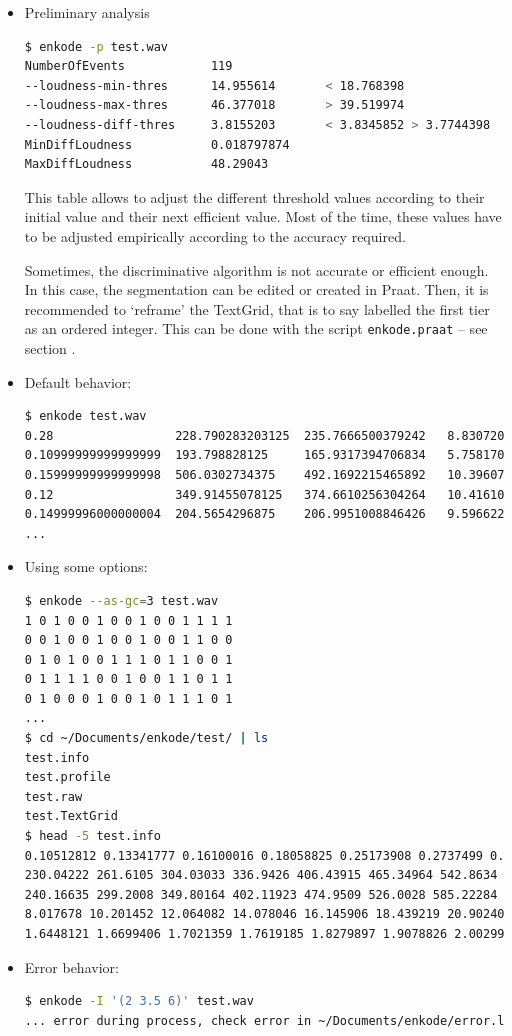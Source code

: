 \begin{itemize}
\item Preliminary analysis
\begin{lstlisting}[language=bash]
$ enkode -p test.wav 
NumberOfEvents            119
--loudness-min-thres      14.955614       < 18.768398
--loudness-max-thres      46.377018       > 39.519974
--loudness-diff-thres     3.8155203       < 3.8345852 > 3.7744398
MinDiffLoudness           0.018797874
MaxDiffLoudness           48.29043
\end{lstlisting}
This table allows to adjust the different threshold values according to their initial value and their next efficient value.
Most of the time, these values have to be adjusted empirically according to the accuracy required.

\smallskip

Sometimes, the discriminative algorithm is not accurate or efficient enough. In this case, the segmentation can be edited or created in Praat. 
Then, it is recommended to `reframe' the TextGrid, that is to say labelled the first tier as an ordered integer. This can be done with the script \texttt{enkode.praat} -- see section .

\item Default behavior:
\begin{lstlisting}[language=bash]
$ enkode test.wav 
0.28                 228.790283203125  235.7666500379242   8.830720512009613    1.7966619273740976  
0.10999999999999999  193.798828125     165.9317394706834   5.758170441172713    1.9914783596510206  
0.15999999999999998  506.0302734375    492.1692215465892   10.396071452511483   1.6476902981421457  
0.12                 349.91455078125   374.6610256304264   10.416102008324566   1.6657044245205024  
0.14999996000000004  204.5654296875    206.9951008846426   9.59662211074838     1.9097877289745604     
...
\end{lstlisting}
\item Using some options:
\begin{lstlisting}[language=bash]
$ enkode --as-gc=3 test.wav
1 0 1 0 0 1 0 0 1 0 0 1 1 1 1  
0 0 1 0 0 1 0 0 1 0 0 1 1 0 0  
0 1 0 1 0 0 1 1 1 0 1 1 0 0 1  
0 1 1 1 1 0 0 1 0 0 1 1 0 1 1  
0 1 0 0 0 1 0 0 1 0 1 1 1 0 1   
...  
$ cd ~/Documents/enkode/test/ | ls
test.info
test.profile
test.raw	
test.TextGrid
$ head -5 test.info
0.10512812 0.13341777 0.16100016 0.18058825 0.25173908 0.2737499 0.3035293  
230.04222 261.6105 304.03033 336.9426 406.43915 465.34964 542.8634  
240.16635 299.2008 349.80164 402.11923 474.9509 526.0028 585.22284  
8.017678 10.201452 12.064082 14.078046 16.145906 18.439219 20.902403  
1.6448121 1.6699406 1.7021359 1.7619185 1.8279897 1.9078826 2.0029936   
\end{lstlisting}
\item Error behavior:
\begin{lstlisting}[language=bash]
$ enkode -I '(2 3.5 6)' test.wav
... error during process, check error in ~/Documents/enkode/error.log ...
\end{lstlisting}
\end{itemize}

